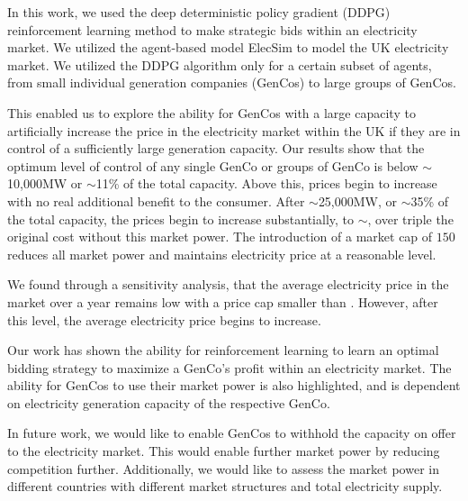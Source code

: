 In this work, we used the deep deterministic policy gradient (DDPG) reinforcement learning method to make strategic bids within an electricity market. We utilized the agent-based model ElecSim to model the UK electricity market. We utilized the DDPG algorithm only for a certain subset of agents, from small individual generation companies (GenCos) to large groups of GenCos. 

This enabled us to explore the ability for GenCos with a large capacity to artificially increase the price in the electricity market within the UK if they are in control of a sufficiently large generation capacity. Our results show that the optimum level of control of any single GenCo or groups of GenCo is below ${\sim}$10,000MW or ${\sim}$11\% of the total capacity. Above this, prices begin to increase with no real additional benefit to the consumer. After ${\sim}$25,000MW, or ${\sim}$35\% of the total capacity, the prices begin to increase substantially, to ${\sim}$, over triple the original cost without this market power. The introduction of a market cap of \textsterling$150$ reduces all market power and maintains electricity price at a reasonable level.

We found through a sensitivity analysis, that the average electricity price in the market over a year remains low with a price cap smaller than . However, after this level, the average electricity price begins to increase.


Our work has shown the ability for reinforcement learning to learn an optimal bidding strategy to maximize a GenCo's profit within an electricity market. The ability for GenCos to use their market power is also highlighted, and is dependent on electricity generation capacity of the respective GenCo.

In future work, we would like to enable GenCos to withhold the capacity on offer to the electricity market. This would enable further market power by reducing competition further.  Additionally, we would like to assess the market power in different countries with different market structures and total electricity supply.

